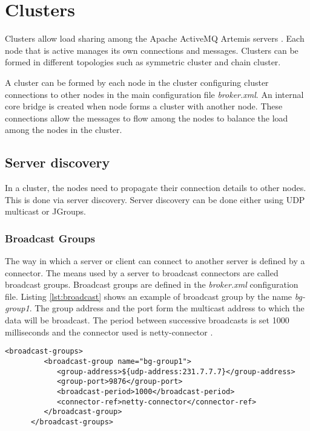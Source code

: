 
\section{Clusters}

Clusters allow load sharing among the Apache ActiveMQ Artemis servers \parencite{artemis_clusters}. Each node that is active manages its own connections and messages. Clusters can be formed in different topologies such as symmetric cluster and chain cluster.

A cluster can be formed by each node in the cluster configuring cluster connections to other nodes in the main configuration file \textit{broker.xml}. An internal core bridge is created when node forms a cluster with another node. These connections allow the messages to flow among the nodes to balance the load among the nodes in the cluster. 


\subsection{Server discovery}

In a cluster, the nodes need to propagate their connection details to other nodes. This is done via server discovery. Server discovery can be done either using UDP multicast or JGroups.

\subsubsection{Broadcast Groups}

The way in which a server or client can connect to another server is defined by a connector. The means used by a server to broadcast connectors are called broadcast groups. Broadcast groups are defined in the \textit{broker.xml} configuration file. Listing \ref{lst:broadcast} shows an example of broadcast group by the name \textit{bg-group1}. The group address and the port form the multicast address to which the data will be broadcast. The period between successive broadcasts is set 1000 milliseconds and the connector used is netty-connector \parencite{netty}.

\bigskip
\begin{lstlisting}[style=XmlInputStyle,caption=Broadcast Group Example, label={lst:broadcast}]
      <broadcast-groups>
         <broadcast-group name="bg-group1">
            <group-address>${udp-address:231.7.7.7}</group-address>
            <group-port>9876</group-port>
            <broadcast-period>1000</broadcast-period>
            <connector-ref>netty-connector</connector-ref>
         </broadcast-group>
      </broadcast-groups>
\end{lstlisting}

